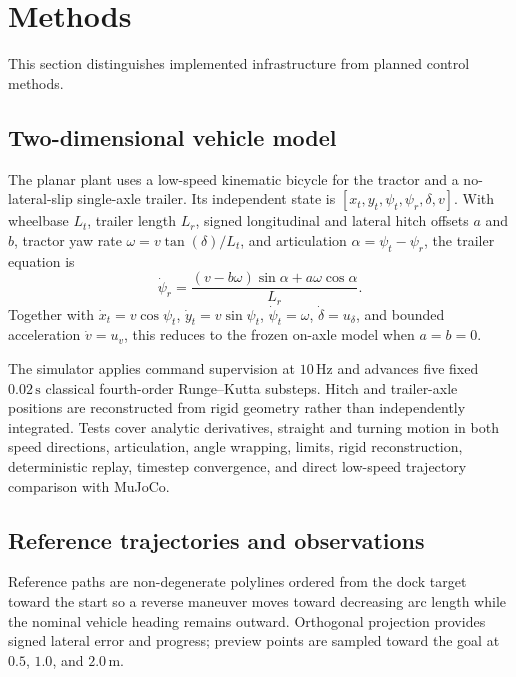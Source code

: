 \section{Methods}

This section distinguishes implemented infrastructure from planned control
methods.

\subsection{Two-dimensional vehicle model}

\implemented{} The planar plant uses a low-speed kinematic bicycle for the
tractor and a no-lateral-slip single-axle trailer. Its independent state is
$[x_t,y_t,\psi_t,\psi_r,\delta,v]$. With wheelbase $L_t$, trailer length $L_r$,
signed longitudinal and lateral hitch offsets $a$ and $b$, tractor yaw rate
$\omega=v\tan(\delta)/L_t$, and articulation
$\alpha=\psi_t-\psi_r$, the trailer equation is
\begin{equation}
 \dot{\psi}_r = \frac{(v-b\omega)\sin\alpha+a\omega\cos\alpha}{L_r}.
\end{equation}
Together with $\dot{x}_t=v\cos\psi_t$, $\dot{y}_t=v\sin\psi_t$,
$\dot{\psi}_t=\omega$, $\dot{\delta}=u_\delta$, and bounded acceleration
$\dot v=u_v$, this reduces to the frozen on-axle model when $a=b=0$.

The simulator applies command supervision at $10\,\mathrm{Hz}$ and advances
five fixed $0.02\,\mathrm{s}$ classical fourth-order Runge--Kutta substeps.
Hitch and trailer-axle positions are reconstructed from rigid geometry rather
than independently integrated. Tests cover analytic derivatives, straight and
turning motion in both speed directions, articulation, angle wrapping, limits,
rigid reconstruction, deterministic replay, timestep convergence, and direct
low-speed trajectory comparison with MuJoCo.

\subsection{Reference trajectories and observations}

\implemented{} Reference paths are non-degenerate polylines ordered from the
dock target toward the start so a reverse maneuver moves toward decreasing arc
length while the nominal vehicle heading remains outward. Orthogonal projection
provides signed lateral error and progress; preview points are sampled toward
the goal at $0.5$, $1.0$, and $2.0\,\mathrm{m}$.


